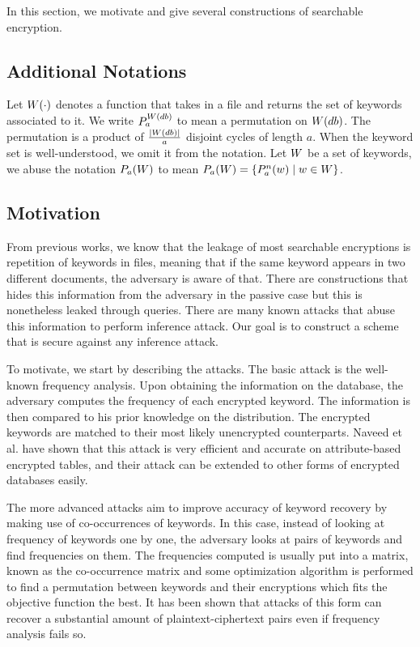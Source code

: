 In this section, we motivate and give several constructions of searchable encryption.

\subsection{Additional Notations}
Let $W(\cdot)$ denotes a function that takes in a file and returns the set of keywords associated to it. We write $P_a^{W(db)}$ to mean a permutation on $W(db)$. The permutation is a product of $\frac{|W(db)|}{a}$ disjoint cycles of length $a$. When the keyword set is well-understood, we omit it from the notation. Let $W$ be a set of keywords, we abuse the notation $P_a(W)$ to mean $P_a(W) = \{ P_a^n(w) \mid w \in W \}$.




\subsection{Motivation}
From previous works, we know that the leakage of most searchable encryptions is repetition of keywords in files, meaning that if the same keyword appears in two different documents, the adversary is aware of that. There are constructions that hides this information from the adversary in the passive case but this is nonetheless leaked through queries. There are many known attacks that abuse this information to perform inference attack. Our goal is to construct a scheme that is secure against any inference attack.

To motivate, we start by describing the attacks. The basic attack is the well-known frequency analysis. Upon obtaining the information on the database, the adversary computes the frequency of each encrypted keyword. The information is then compared to his prior knowledge on the distribution. The encrypted keywords are matched to their most likely unencrypted counterparts. Naveed et al. \cite{CCS:NavKamWri15} have shown that this attack is very efficient and accurate on attribute-based encrypted tables, and their attack can be extended to other forms of encrypted databases easily.

The more advanced attacks aim to improve accuracy of keyword recovery by making use of co-occurrences of keywords. In this case, instead of looking at frequency of keywords one by one, the adversary looks at pairs of keywords and find frequencies on them. The frequencies computed is usually put into a matrix, known as the co-occurrence matrix and some optimization algorithm is performed to find a permutation between keywords and their encryptions which fits the objective function the best. It has been shown that attacks of this form can recover a substantial amount of plaintext-ciphertext pairs even if frequency analysis fails so.

